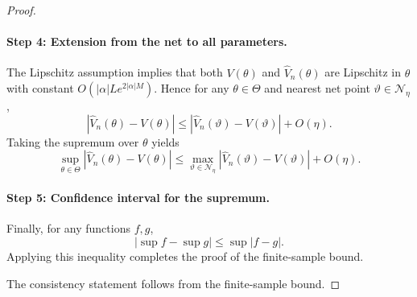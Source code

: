 \documentclass{article}
\theoremstyle{plain}
\theoremstyle{definition}
\theoremstyle{remark}
\begin{document}
\begin{proof}
\paragraph{Step 4: Extension from the net to all parameters.}
The Lipschitz assumption implies that both $V(\theta)$ and $\widehat V_n(\theta)$
are Lipschitz in $\theta$ with constant
$O(|\alpha|Le^{2|\alpha|M})$.
Hence for any $\theta\in\Theta$ and nearest net point $\vartheta\in\mathcal{N}_\eta$,
\[
|\widehat V_n(\theta)-V(\theta)|
\le
|\widehat V_n(\vartheta)-V(\vartheta)| + O(\eta).
\]
Taking the supremum over $\theta$ yields
\[
\sup_{\theta\in\Theta}|\widehat V_n(\theta)-V(\theta)|
\le
\max_{\vartheta\in\mathcal{N}_\eta}|\widehat V_n(\vartheta)-V(\vartheta)| + O(\eta).
\]

\paragraph{Step 5: Confidence interval for the supremum.}
Finally, for any functions $f,g$,
\[
|\sup f - \sup g| \le \sup |f-g|.
\]
Applying this inequality completes the proof of the finite-sample bound.

The consistency statement follows from the finite-sample bound.

\end{proof}
\end{document}

